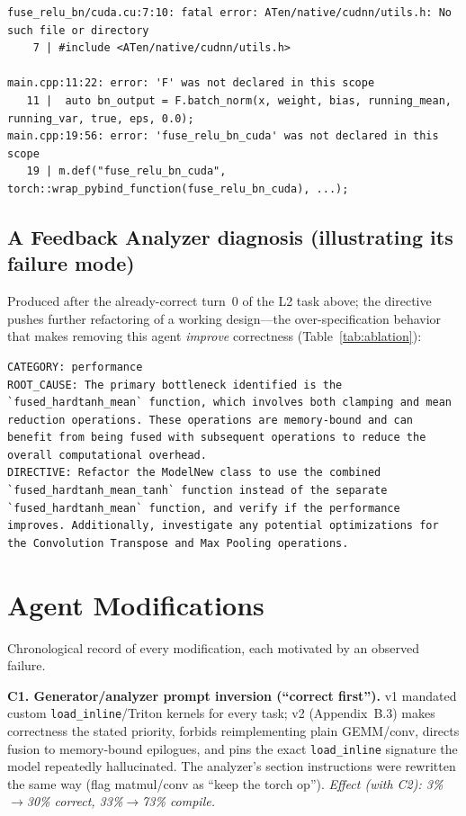 \documentclass[conference]{IEEEtran}
\begin{document}
\begin{lstlisting}
fuse_relu_bn/cuda.cu:7:10: fatal error: ATen/native/cudnn/utils.h: No such file or directory
    7 | #include <ATen/native/cudnn/utils.h>

main.cpp:11:22: error: 'F' was not declared in this scope
   11 |  auto bn_output = F.batch_norm(x, weight, bias, running_mean, running_var, true, eps, 0.0);
main.cpp:19:56: error: 'fuse_relu_bn_cuda' was not declared in this scope
   19 | m.def("fuse_relu_bn_cuda", torch::wrap_pybind_function(fuse_relu_bn_cuda), ...);
\end{lstlisting}

\subsection{A Feedback Analyzer diagnosis (illustrating its failure mode)}
Produced after the already-correct turn~0 of the L2 task above; the directive
pushes further refactoring of a working design---the over-specification behavior
that makes removing this agent \emph{improve} correctness (Table~\ref{tab:ablation}):

\begin{lstlisting}
CATEGORY: performance
ROOT_CAUSE: The primary bottleneck identified is the `fused_hardtanh_mean` function, which involves both clamping and mean reduction operations. These operations are memory-bound and can benefit from being fused with subsequent operations to reduce the overall computational overhead.
DIRECTIVE: Refactor the ModelNew class to use the combined `fused_hardtanh_mean_tanh` function instead of the separate `fused_hardtanh_mean` function, and verify if the performance improves. Additionally, investigate any potential optimizations for the Convolution Transpose and Max Pooling operations.
\end{lstlisting}

\section{Agent Modifications}

Chronological record of every modification, each motivated by an observed failure.

\textbf{C1. Generator/analyzer prompt inversion (``correct first'').}
v1 mandated custom \texttt{load\_inline}/Triton kernels for every task; v2
(Appendix~B.3) makes correctness the stated priority, forbids reimplementing plain
GEMM/conv, directs fusion to memory-bound epilogues, and pins the exact
\texttt{load\_inline} signature the model repeatedly hallucinated. The analyzer's
section instructions were rewritten the same way (flag matmul/conv as ``keep the
torch op''). \emph{Effect (with C2): 3\%$\to$30\% correct, 33\%$\to$73\% compile.}
\end{document}
